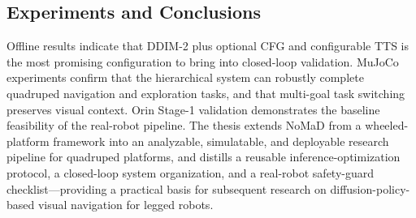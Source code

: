 \begin{digest}[en]
\subsection*{Experiments and Conclusions}

Offline results indicate that DDIM-2 plus optional CFG and configurable TTS is the most
promising configuration to bring into closed-loop validation. MuJoCo experiments confirm
that the hierarchical system can robustly complete quadruped navigation and exploration
tasks, and that multi-goal task switching preserves visual context. Orin Stage-1
validation demonstrates the baseline feasibility of the real-robot pipeline. The thesis
extends NoMaD from a wheeled-platform framework into an analyzable, simulatable, and
deployable research pipeline for quadruped platforms, and distills a reusable
inference-optimization protocol, a closed-loop system organization, and a real-robot
safety-guard checklist---providing a practical basis for subsequent research on
diffusion-policy-based visual navigation for legged robots.

\end{digest}
